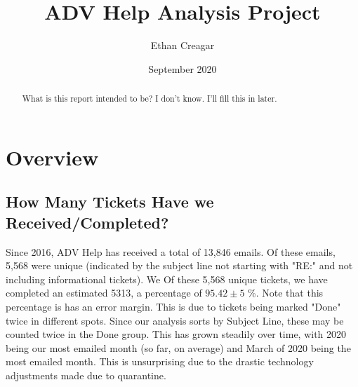 \documentclass[12pt]{article}
\title{ADV Help Analysis Project}
\author{Ethan Creagar}
\date{September 2020}
\begin{document}
\begin{titlepage}
\maketitle
\end{titlepage}

\tableofcontents
\bigskip

\listoffigures
\newpage

\begin{abstract}
What is this report intended to be? I don't know. I'll fill this in later.
\end{abstract} \hspace{10pt}


\section{Overview}

\subsection{How Many Tickets Have we Received/Completed?}

Since 2016, ADV Help has received a total of 13,846 emails. Of these emails, 5,568 were unique (indicated by the subject line not starting with "RE:" and not including informational tickets). We Of these 5,568 unique tickets, we have completed an estimated 5313, a percentage of $95.42 \pm 5$ \%. Note that this percentage is has an error margin. This is due to tickets being marked "Done" twice in different spots. Since our analysis sorts by Subject Line, these may be counted twice in the Done group. This has grown steadily over time, with 2020 being our most emailed month (so far, on average) and March of 2020 being the most emailed month. This is unsurprising due to the drastic technology adjustments made due to quarantine.
\end{document}
